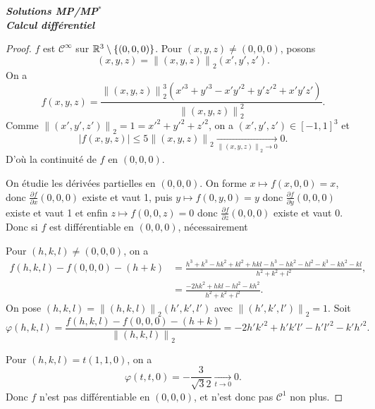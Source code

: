 \documentclass[12pt]{article}
\begin{document}
\begin{titlepage}
	\centering
	\vspace*{\fill}
	\Huge \textit{\textbf{Solutions MP/MP$^*$\\ Calcul différentiel}}
	\vspace*{\fill}
\end{titlepage}

\begin{proof}
	$f$ est $\mathcal{C}^{\infty}$ sur $\mathbb{R}^{3}\setminus\left\lbrace(0,0,0)\right\rbrace$. Pour $(x,y,z)\neq(0,0,0)$, posons 
	\begin{equation}
		(x,y,z)=\left\lVert (x,y,z)\right\rVert_{2}(x',y',z').	
	\end{equation}
	On a 
	\begin{equation}
		f(x,y,z)=\frac{\left\lVert (x,y,z)\right\rVert_{2}^{3}(x'^{3}+y'^{3}-x'y'^{2}+y'z'^{2}+x'y'z')}{\left\lVert(x,y,z)\right\rVert_{2}^{2}}.
	\end{equation}
	Comme $\left\lVert (x',y',z')\right\rVert_{2}=1=x'^{2}+y'^{2}+z'^{2}$, on a $(x',y',z')\in[-1,1]^{3}$ et 
	\begin{equation}
		\left\lvert f(x,y,z)\right\rvert\leqslant5\left\lVert (x,y,z)\right\rVert_{2}\xrightarrow[\left\lVert (x,y,z)\right\rVert_{2}\to0]{}0.
	\end{equation}
	D'où la continuité de $f$ en $(0,0,0)$.

	On étudie les dérivées partielles en $(0,0,0)$. On forme $x\mapsto f(x,0,0)=x$, donc $\frac{\partial f}{\partial x}(0,0,0)$ existe et vaut 1, puis $y\mapsto f(0,y,0)=y$ donc $\frac{\partial f}{\partial y}(0,0,0)$ existe et vaut 1 et enfin $z\mapsto f(0,0,z)=0$ donc $\frac{\partial f}{\partial z}(0,0,0)$ existe et vaut 0. Donc si $f$ est différentiable en $(0,0,0)$, nécessairement 

	Pour $(h,k,l)\neq(0,0,0)$, on a 
	\begin{align}
		f(h,k,l)-f(0,0,0)-(h+k)
		&=\frac{h^{3}+k^{3}-hk^{2}+kl^{2}+hkl-h^{3}-hk^{2}-hl^{2}-k^{3}-kh^{2}-kl}{h^{2}+k^{2}+l^{2}},\\
		&=\frac{-2hk^{2}+hkl-hl^{2}-kh^{2}}{h^{2}+k^{2}+l^{2}}.
	\end{align}
	On pose $(h,k,l)=\left\lVert (h,k,l)\right\rVert_{2}(h',k',l')$ avec $\left\lVert (h',k',l')\right\rVert_{2}=1$. Soit 
	\begin{equation}
		\varphi(h,k,l)=\frac{f(h,k,l)-f(0,0,0)-(h+k)}{\left\lVert(h,k,l)\right\rVert_{2}}=-2h'k'^{2}+h'k'l'-h'l'^{2}-k'h'^{2}.
	\end{equation}
	
	Pour $(h,k,l)=t(1,1,0)$, on a 
	\begin{equation}
		\varphi(t,t,0)=-\frac{3}{\sqrt{3}{2}}\xrightarrow[t\to0]{}0.
	\end{equation}
	Donc $f$ n'est pas différentiable en $(0,0,0)$, et n'est donc pas $\mathcal{C}^{1}$ non plus.
\end{proof}
\end{document}
